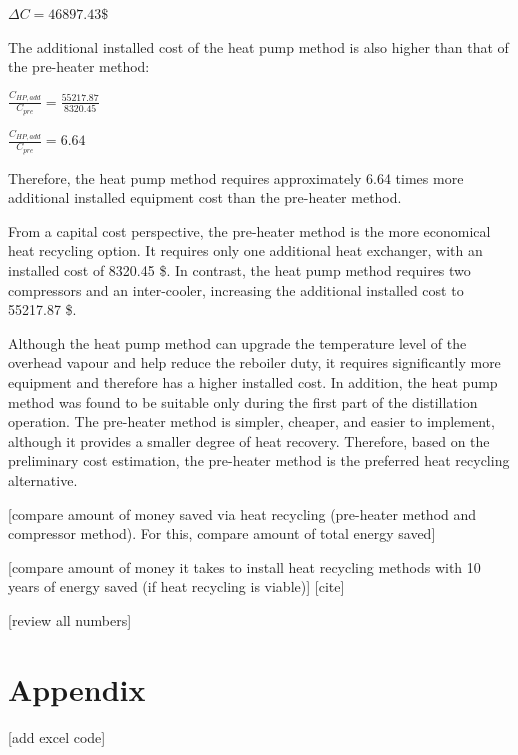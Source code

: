 \(\Delta C = 46897.43 \text{\$}\)

The additional installed cost of the heat pump method is also higher
than that of the pre-heater method:

\(\frac{C_{HP,add}}{C_{pre}} = \frac{55217.87}{8320.45}\)

\(\frac{C_{HP,add}}{C_{pre}} = 6.64\)

Therefore, the heat pump method requires approximately 6.64 times more
additional installed equipment cost than the pre-heater method.

From a capital cost perspective, the pre-heater method is the more
economical heat recycling option. It requires only one additional heat
exchanger, with an installed cost of 8320.45 \$. In contrast, the heat
pump method requires two compressors and an inter-cooler, increasing the
additional installed cost to 55217.87 \$.

Although the heat pump method can upgrade the temperature level of the
overhead vapour and help reduce the reboiler duty, it requires
significantly more equipment and therefore has a higher installed cost.
In addition, the heat pump method was found to be suitable only during
the first part of the distillation operation. The pre-heater method is
simpler, cheaper, and easier to implement, although it provides a
smaller degree of heat recovery. Therefore, based on the preliminary
cost estimation, the pre-heater method is the preferred heat recycling
alternative.

{[}compare amount of money saved via heat recycling (pre-heater method
and compressor method). For this, compare amount of total energy
saved{]}

{[}compare amount of money it takes to install heat recycling methods
with 10 years of energy saved (if heat recycling is viable){]}
{[}cite{]}

{[}review all numbers{]}

\chapter{Appendix}\label{appendix}

{[}add excel code{]}
